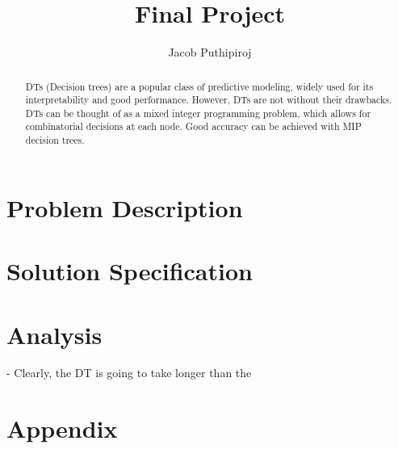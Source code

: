 \documentclass{article}
\begin{document}
\title{Final Project}
\author{Jacob Puthipiroj}
\maketitle

\begin{abstract}
	DTs (Decision trees) are a popular class of predictive modeling, widely used for its interpretability and good performance. However, DTs are not without their drawbacks. DTs can be thought of as a mixed integer programming problem, which allows for combinatorial decisions at each node. Good accuracy can be achieved with MIP decision trees. 
\end{abstract}



\section*{Problem Description}




\section*{Solution Specification}

\section*{Analysis}
- Clearly, the DT is going to take longer than the 




\section*{Appendix}
\end{document}
